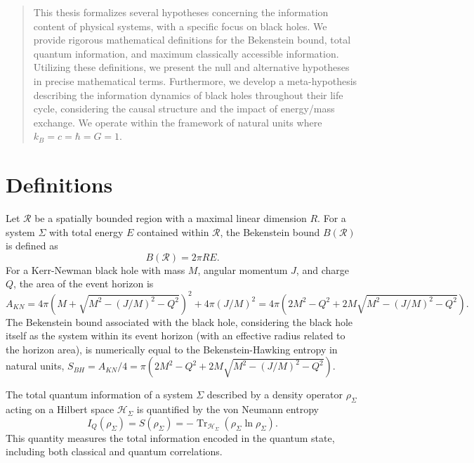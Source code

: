 	
	
	\begin{abstract}
		This thesis formalizes several hypotheses concerning the information content of physical systems, with a specific focus on black holes. We provide rigorous mathematical definitions for the Bekenstein bound, total quantum information, and maximum classically accessible information. Utilizing these definitions, we present the null and alternative hypotheses in precise mathematical terms. Furthermore, we develop a meta-hypothesis describing the information dynamics of black holes throughout their life cycle, considering the causal structure and the impact of energy/mass exchange. We operate within the framework of natural units where $k_B = c = \hbar = G = 1$.
	\end{abstract}
	
	\section{Definitions}
	
	\begin{definition}
		Let $\mathcal{R}$ be a spatially bounded region with a maximal linear dimension $R$. For a system $\Sigma$ with total energy $E$ contained within $\mathcal{R}$, the Bekenstein bound $B(\mathcal{R})$ is defined as
		$$B(\mathcal{R}) = 2 \pi R E.$$
		For a Kerr-Newman black hole with mass $M$, angular momentum $J$, and charge $Q$, the area of the event horizon is
		$$A_{KN} = 4 \pi \left( M + \sqrt{M^2 - (J/M)^2 - Q^2} \right)^2 + 4 \pi (J/M)^2 = 4 \pi \left( 2 M^2 - Q^2 + 2 M \sqrt{M^2 - (J/M)^2 - Q^2} \right).$$
		The Bekenstein bound associated with the black hole, considering the black hole itself as the system within its event horizon (with an effective radius related to the horizon area), is numerically equal to the Bekenstein-Hawking entropy in natural units, $S_{BH} = A_{KN} / 4 = \pi \left( 2 M^2 - Q^2 + 2 M \sqrt{M^2 - (J/M)^2 - Q^2} \right)$.
	\end{definition}
	
	\begin{definition}
		The total quantum information of a system $\Sigma$ described by a density operator $\rho_\Sigma$ acting on a Hilbert space $\mathcal{H}_\Sigma$ is quantified by the von Neumann entropy
		$$I_Q(\rho_\Sigma) = S(\rho_\Sigma) = - \operatorname{Tr}_{\mathcal{H}_\Sigma}(\rho_\Sigma \ln \rho_\Sigma).$$
		This quantity measures the total information encoded in the quantum state, including both classical and quantum correlations.
	\end{definition}
	
